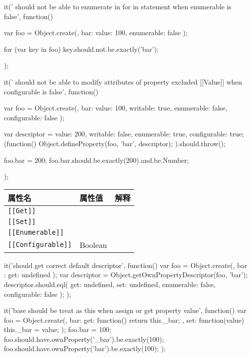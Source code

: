 \begin{JavaScript}
		it(' should not be able to enumerate in for in statement when enumerable is false', function(){
			var foo = Object.create({}, {
				bar: {value: 100, enumerable: false}
			});

			for (var key in foo)
			{
				key.should.not.be.exactly('bar');
			}
		});
\end{JavaScript}

\begin{JavaScript}
		it(' should not be able to modify attributes of property excluded [[Value]] when configurable is false', function(){
			var foo = Object.create({}, {
				bar: {value: 100, writable: true, enumerable: false, configurable: false}
			});

			var descriptor = {value: 200, writable: false, enumerable: true, configurable: true};
			(function(){
				Object.defineProperty(foo, 'bar', descriptor);
			}).should.throw();

			foo.bar = 200;
			foo.bar.should.be.exactly(200).and.be.Number;			
		});
\end{JavaScript}

\begin{tabular}{|l|l|l|}
\hline
属性名 & 属性值 & 解释 \\
\hline
\lstinline![[Get]]! & & \\
\hline
\lstinline![[Set]]! & & \\
\hline
\lstinline![[Enumerable]]! & & \\
\hline
\lstinline![[Configurable]]! & Boolean & \\
\hline
\end{tabular}

\begin{JavaScript}
		it('should get correct default descriptor', function(){
			var foo = Object.create({}, {
				bar : {get: undefined}
			});
			var descriptor = Object.getOwnPropertyDescriptor(foo, 'bar');
			descriptor.should.eql({
				get: undefined,
				set: undefined,
				enumerable: false,
				configurable: false
			});
		});
\end{JavaScript}

\begin{JavaScript}
		it('base should be treat as this when assign or get property value', function(){
			var foo = Object.create({}, {
				bar: {get: function(){
					return this._bar;
				}, 
				set: function(value){
					this._bar = value;
				}}
			});
			foo.bar = 100;
			foo.should.have.ownProperty('_bar').be.exactly(100);
			foo.should.have.ownProperty('bar').be.exactly(100);
		});
\end{JavaScript}


